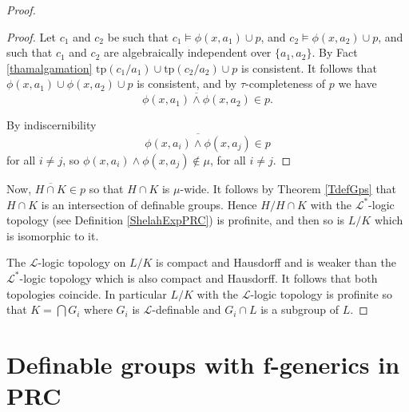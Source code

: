 \documentclass[12pt]{article}
\theoremstyle{definition}
\theoremstyle{mystyle}
\theoremstyle{remark}
\newenvironment{claimproof}
    {\begin{proof}}{\renewcommand\qedsymbol{\Squarepipe} \end{proof}}
\newcommand{\tp}{\mathrm{tp}}
\begin{document}
\begin{proof}
\begin{claimproof}
Let $c_1$ and $c_2$ be such that $c_1 \models \phi(x, a_1) \cup p$, and $c_2 \models \phi(x, a_2) \cup p$, and such that $c_1$ and $c_2$ are algebraically independent over $\{a_1, a_2\}$.
By Fact \ref{thamalgamation} $ \tp(c_1/a_1) \cup \tp(c_2/a_2) \cup p$ is consistent.
It follows that $\phi(x, a_1) \cup \phi(x, a_2) \cup p$ is consistent, and by $\tau$-completeness of $p$ we have
\[\overline{\phi(x, a_1) \wedge \phi(x, a_2)} \in p.\]

By indiscernibility \[\overline{\phi(x, a_i) \wedge \phi(x, a_j)} \in p\] for all $i \not = j$, so $\phi(x, a_i) \wedge \phi(x, a_j) \not \in \mu$, for all $i \not = j$.
\end{claimproof}

Now, ${\overline{H \cap K}}\in p$ so that $H \cap K$ is
$\mu$-wide. It follows by Theorem \ref{TdefGps} that $H \cap K$ is
an intersection of definable groups. Hence $H/H\cap K$ with the
$\mathcal L^*$-logic topology (see Definition \ref{ShelahExpPRC})
is profinite, and then so is $L/K$ which is isomorphic to it.

The $\mathcal L$-logic topology on $L/K$ is compact and Hausdorff
and is weaker than the $\mathcal L^*$-logic topology which is also
compact and Hausdorff. It follows that both topologies coincide.
In particular $L/K$ with the $\mathcal L$-logic topology is
profinite so that $K=\bigcap G_i$ where $G_i$ is $\mathcal
L$-definable and $G_i\cap L$ is a subgroup of $L$.
\end{proof}








\section{Definable groups with f-generics in PRC}\label{STheorem}
\end{document}
